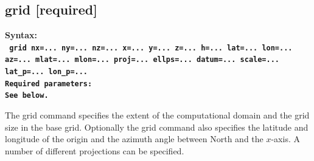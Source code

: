 \documentclass[11pt]{report}
\begin{document}
\subsection{grid [required]}
\label{keyword:grid}
\begin{flushleft}
\bf Syntax:\\
\tt
grid nx=...  ny=...  nz=...
x=... y=... z=... h=... lat=... lon=... az=... mlat=... mlon=... proj=... ellps=...
datum=... scale=... lat\_p=... lon\_p=...\\
\bf Required parameters:\\
\rm See below.
\end{flushleft}
The grid command specifies the extent of the computational domain and the grid size in the base
grid. Optionally the grid command also specifies the latitude and longitude of the origin and the
azimuth angle between North and the $x$-axis. A number of different projections can be specified.
\end{document}
